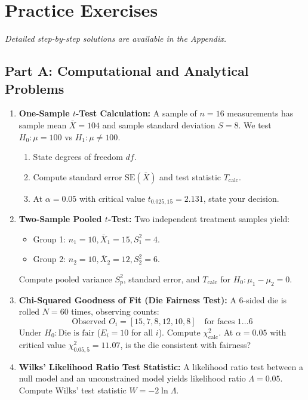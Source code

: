 \newpage
\section{Practice Exercises}
\textit{Detailed step-by-step solutions are available in the Appendix.}

\subsection*{Part A: Computational and Analytical Problems}

\begin{enumerate}
\item \textbf{One-Sample $t$-Test Calculation:} A sample of $n = 16$ measurements has sample mean $\bar{X} = 104$ and sample standard deviation $S = 8$. We test $H_0 \colon \mu = 100$ vs $H_1 \colon \mu \neq 100$.
    \begin{enumerate}
        \item State degrees of freedom $df$.
        \item Compute standard error $\text{SE}(\bar{X})$ and test statistic $T_{\text{calc}}$.
        \item At $\alpha = 0.05$ with critical value $t_{0.025, 15} = 2.131$, state your decision.
    \end{enumerate}

\item \textbf{Two-Sample Pooled $t$-Test:} Two independent treatment samples yield:
\begin{itemize}
    \item Group 1: $n_1 = 10, \bar{X}_1 = 15, S_1^2 = 4$.
    \item Group 2: $n_2 = 10, \bar{X}_2 = 12, S_2^2 = 6$.
\end{itemize}
    Compute pooled variance $S_p^2$, standard error, and $T_{\text{calc}}$ for $H_0 \colon \mu_1 - \mu_2 = 0$.

\item \textbf{Chi-Squared Goodness of Fit (Die Fairness Test):} A 6-sided die is rolled $N = 60$ times, observing counts:
    $$\text{Observed } O_i = [15, 7, 8, 12, 10, 8] \quad \text{for faces } 1 \dots 6$$
    Under $H_0 \colon \text{Die is fair}$ ($E_i = 10$ for all $i$). Compute $\chi_{\text{calc}}^2$. At $\alpha = 0.05$ with critical value $\chi_{0.05, 5}^2 = 11.07$, is the die consistent with fairness?

\item \textbf{Wilks' Likelihood Ratio Test Statistic:} A likelihood ratio test between a null model and an unconstrained model yields likelihood ratio $\Lambda = 0.05$. Compute Wilks' test statistic $W = -2 \ln \Lambda$.


\end{enumerate}
